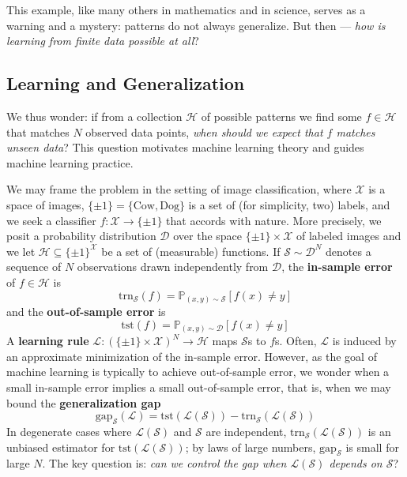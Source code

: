 \documentclass[twocolumn]{article}
\newcommand{\PP}{\mathbb{P}}
\newcommand{\Dd}{\mathcal{D}}
\newcommand{\Ee}{\mathcal{E}}
\newcommand{\Hh}{\mathcal{H}}
\newcommand{\Ll}{\mathcal{L}}
\newcommand{\Ss}{\mathcal{S}}
\newcommand{\Uu}{\mathcal{U}}
\newcommand{\Xx}{\mathcal{X}}
\newcommand{\Ein} {\text{trn}_{\Ss}} %
\newcommand{\Egap}{\text{gap}_{\Ss}}
\newcommand{\Eout}{\text{tst}} %
\theoremstyle{definition}
\begin{document}
        This example, like many others in mathematics and in science, serves as
        a warning and a mystery: patterns do not always generalize.  But then
        --- \emph{how is learning from finite data possible at all}? 

        \subsection*{Learning and Generalization}

        We thus wonder: if from a collection $\Hh$ of possible patterns we find
        some $f\in \Hh$ that matches $N$ observed data points, \emph{when
        should we expect that $f$ matches unseen data}?  This question
        motivates machine learning theory and guides machine learning practice.
        
        We may frame the problem in the setting of image classification,
        where $\Xx$ is a space of images, $\{\pm 1\} = \{\text{Cow}, \text{Dog}\}$ is
        a set of (for simplicity, two) labels, and we seek a classifier
        $f: \Xx\to\{\pm 1\}$ that accords with nature.
        More precisely, we posit a probability distribution $\Dd$ over the space
        $\{\pm 1\}\times\Xx$ of labeled images and we let $\Hh \subseteq \{\pm
        1\}^\Xx$ be a set of (measurable) functions.  If $\Ss \sim \Dd^N$ denotes a
        sequence of $N$ observations drawn independently from $\Dd$, the
        \textbf{in-sample error} of $f\in \Hh$ is 
        $$
            \Ein(f) = \PP_{(x,y)\sim \Ss}[f(x)\neq y] 
        $$
        and the \textbf{out-of-sample error} is 
        $$
            \Eout(f) = \PP_{(x,y)\sim \Dd}[f(x)\neq y] 
        $$
        A \textbf{learning rule} $\Ll: (\{\pm 1\}\times\Xx)^N \to \Hh$ maps
        $\Ss$s to $f$s.
        Often, $\Ll$ is induced by an approximate minimization of the in-sample
        error.  However, as the goal of machine learning is typically to 
        achieve out-of-sample error, 
        we wonder when a small in-sample error implies a
        small out-of-sample error, that is, when we may bound the
        \textbf{generalization gap} 
        $$
            \Egap(\Ll) = \Eout(\Ll(\Ss)) - \Ein(\Ll(\Ss)) 
        $$
        In degenerate cases where $\Ll(\Ss)$ and $\Ss$ are independent,
        $\Ein(\Ll(\Ss))$ is an unbiased estimator for $\Eout(\Ll(\Ss))$; by
        laws of large numbers, $\Egap$ is small for large $N$.  The key question
        is:
        \emph{can we control the gap when $\Ll(\Ss)$ depends on $\Ss$}?
\end{document}
